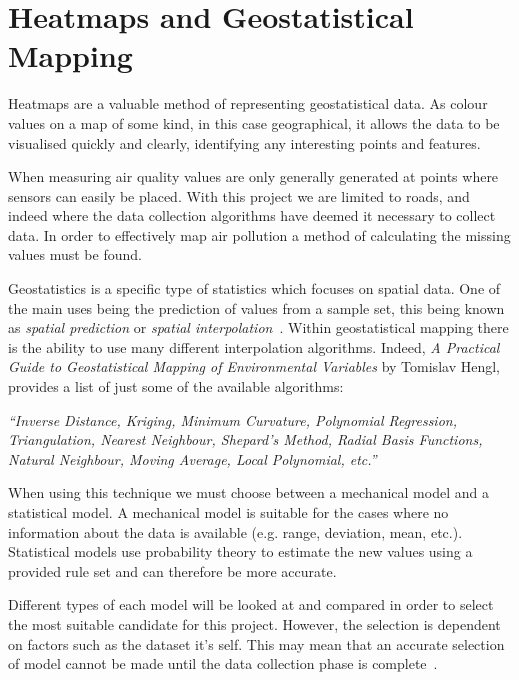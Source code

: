 \section{Heatmaps and Geostatistical Mapping}\label{geostatistics}


Heatmaps are a valuable method of representing geostatistical data. As colour values on a map of some kind, in this case geographical, it allows the data to be visualised quickly and clearly, identifying any interesting points and features.

When measuring air quality values are only generally generated at points where sensors can easily be placed. With this project we are limited to roads, and indeed where the data collection algorithms have deemed it necessary to collect data. In order to effectively map air pollution a method of calculating the missing values must be found.

Geostatistics is a specific type of statistics which focuses on spatial data. One of the main uses being the prediction of values from a sample set, this being known as \emph{spatial prediction} or \emph{spatial interpolation}~\cite{practicalguidestatisticalmapping}. Within geostatistical mapping there is the ability to use many different interpolation algorithms. Indeed, \emph{A Practical Guide to Geostatistical Mapping of Environmental Variables} by Tomislav Hengl, provides a list of just some of the available algorithms: 

\emph{``Inverse Distance, Kriging, Minimum Curvature, Polynomial Regression, Triangulation, Nearest Neighbour, Shepard’s Method, Radial Basis Functions, Natural Neighbour, Moving Average, Local Polynomial, etc.''}

When using this technique we must choose between a mechanical model and a statistical model. A mechanical model is suitable for the cases where no information about the data is available (e.g. range, deviation, mean, etc.). Statistical models use probability theory to estimate the new values using a provided rule set and can therefore be more accurate. 

Different types of each model will be looked at and compared in order to select the most suitable candidate for this project. However, the selection is dependent on factors such as the dataset it's self. This may mean that an accurate selection of model cannot be made until the data collection phase is complete~\cite{mappingairpollutionusinggis}. 

